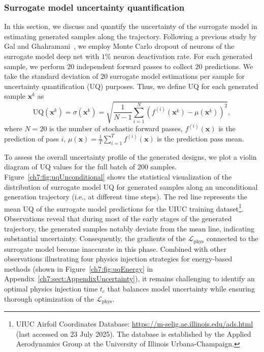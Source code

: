 \subsubsection{Surrogate model uncertainty quantification}
\label{ch7:subsect:uncertainty}
In this section, we discuss and quantify the uncertainty of the surrogate model in estimating generated samples along the trajectory. Following a previous study by Gal and Ghahramani~\cite{ai.Gal2016}, we employ Monte Carlo dropout of neurons of the surrogate model deep net with $1\%$ neuron deactivation rate. For each generated sample, we perform $20$ independent forward passes to collect $20$ predictions. We take the standard deviation of $20$ surrogate model estimations per sample for uncertainty quantification (UQ) purposes. Thus, we define UQ for each generated sample $\mathbf{x}^k$ as 
\begin{equation}
\mathrm{UQ}(\mathbf{x}^k)=\sigma(\mathbf{x}^k)=\sqrt{\frac{1}{N-1} \sum_{i=1}^N\left(f^{(i)}(\mathbf{x}^k)-\mu(\mathbf{x}^k)\right)^2},
\end{equation}
where $N=20$ is the number of stochastic forward passes, $f^{(i)}(\mathbf{x})$ is the prediction of pass $i$, $\mu(\mathbf{x})=\frac{1}{T} \sum_{i=1}^T f^{(i)}(\mathbf{x})$ is the prediction pass mean.

To assess the overall uncertainty profile of the generated designs, we plot a violin diagram of UQ values for the full batch of 200 samples. Figure~\ref{ch7:fig:uqUnconditional} shows the statistical visualization of the distribution of surrogate model UQ for generated samples along an unconditional generation trajectory (i.e., at different time steps). The red line represents the mean UQ of the surrogate model predictions for the UIUC training dataset\footnote{UIUC Airfoil Coordinates Database: \url{https://m-selig.ae.illinois.edu/ads.html} (last accessed on 23 July 2025). The database is established by the Applied Aerodynamics Group at the University of Illinois Urbana-Champaign.}. Observations reveal that during most of the early stages of the generated trajectory, the generated samples notably deviate from the mean line, indicating substantial uncertainty. Consequently, the gradients of the $\mathcal{L}_{\mathrm{phys}}$ connected to the surrogate model become inaccurate in this phase. Combined with other observations  illustrating four physics injection strategies for energy-based methods (shown in Figure~\ref{ch7:fig:uqEnergy} in Appendix~\ref{ch7:sect:AppendixUncertainty}), it remains challenging to identify an optimal physics injection time $t_c$ that balances model uncertainty while ensuring thorough optimization of the $\mathcal{L}_{\mathrm{phys}}$.

